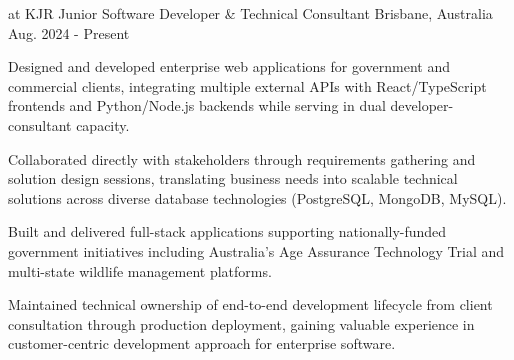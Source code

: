

\begin{cventries}

  \cventry
    {at KJR} %
    {Junior Software Developer \& Technical Consultant} %
    {Brisbane, Australia} %
    {Aug. 2024 - Present} %
    {
      \begin{cvitems} %
        \item {Designed and developed enterprise web applications for government and commercial clients, integrating multiple external APIs with React/TypeScript frontends and Python/Node.js backends while serving in dual developer-consultant capacity.}
        \item {Collaborated directly with stakeholders through requirements gathering and solution design sessions, translating business needs into scalable technical solutions across diverse database technologies (PostgreSQL, MongoDB, MySQL).}
        \item {Built and delivered full-stack applications supporting nationally-funded government initiatives including Australia's Age Assurance Technology Trial and multi-state wildlife management platforms.}
        \item {Maintained technical ownership of end-to-end development lifecycle from client consultation through production deployment, gaining valuable experience in customer-centric development approach for enterprise software.}
      \end{cvitems}
    }



\end{cventries}
